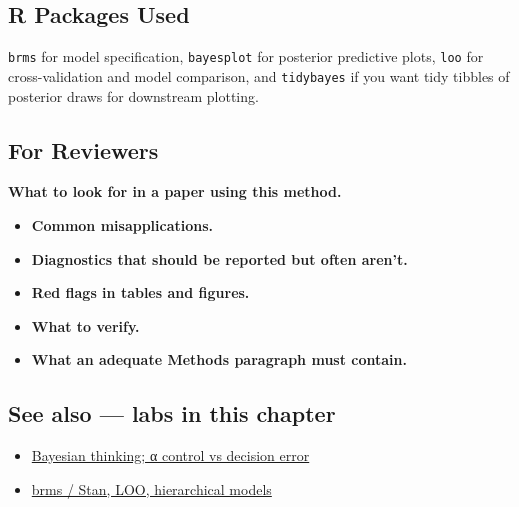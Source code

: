 \documentclass[
]{article}
\providecommand{\tightlist}{%
  \setlength{\itemsep}{0pt}\setlength{\parskip}{0pt}}
\begin{document}
\subsection{R Packages Used}\label{r-packages-used}

\texttt{brms} for model specification, \texttt{bayesplot} for posterior
predictive plots, \texttt{loo} for cross-validation and model
comparison, and \texttt{tidybayes} if you want tidy tibbles of posterior
draws for downstream plotting.

\subsection{For Reviewers}\label{for-reviewers}

\textbf{What to look for in a paper using this method.}

\begin{itemize}
\tightlist
\item
  \textbf{Common misapplications.}
\item
  \textbf{Diagnostics that should be reported but often aren't.}
\item
  \textbf{Red flags in tables and figures.}
\item
  \textbf{What to verify.}
\item
  \textbf{What an adequate Methods paragraph must contain.}
\end{itemize}

\subsection{See also --- labs in this
chapter}\label{see-also-labs-in-this-chapter}

\begin{itemize}
\tightlist
\item
  \href{labs/lab-bayesian-thinking-control-vs-decision-error.Rmd}{Bayesian
  thinking; α control vs decision error}
\item
  \href{labs/lab-brms-stan-loo-hierarchical-models.Rmd}{brms / Stan,
  LOO, hierarchical models}
\end{itemize}
\end{document}
